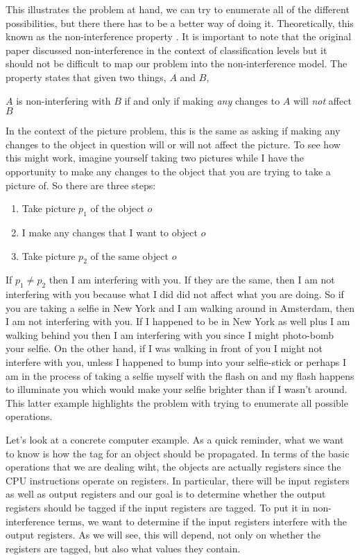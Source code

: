 This illustrates the problem at hand, we can try to enumerate all of the different possibilities, but there 
there has to be a better way of doing it. Theoretically, this known as the non-interference property \cite{Goguen82}. 
It is important to note that the original paper discussed non-interference in the context of classification levels
but it should not be difficult to map our problem into the non-interference model. The property states
that given two things, $A$ and $B$, 

\begin{definition}
$A$ is non-interfering with $B$ if and only if making {\em any} changes to $A$ will {\em not} affect $B$
\end{definition}

In the context of the picture problem, this is the same as asking if
making any changes to the object in question will or will not affect the picture. To see how this 
might work, imagine yourself taking two pictures while I have the opportunity to make any changes 
to the object that you are trying to take a picture of. So there are three steps:

\begin{enumerate}
\item Take picture $p_1$ of the object $o$
\item I make any changes that I want to object $o$
\item Take picture $p_2$ of the same object $o$
\end{enumerate}

If $p_1 \neq p_2$ then I am interfering with you. If they are the same, then I am not interfering
with you because what I did did not affect what you are doing. So if you are taking a selfie in New York
and I am walking around in Amsterdam, then I am not interfering with you. If I happened to be in New York
as well plus I am walking behind you then I am interfering with you since I might photo-bomb your 
selfie. On the other hand, if I was walking in front of you I might not interfere with you, unless
I happened to bump into your selfie-stick or perhaps I am in the process of taking a selfie myself
with the flash on and my flash happens to illuminate you which would make your selfie brighter than
if I wasn't around. This latter example highlights the problem with trying to enumerate all possible
operations. 

Let’s look at a concrete computer example.
As a quick reminder, what we want to know is how the tag for an object should be propagated. In terms of
the basic operations that we are dealing wiht, the objects are actually registers since the CPU 
instructions operate on registers. In particular, there will be input registers as well as output
registers and our goal is to determine whether the output registers should be tagged if the 
input registers are tagged. To put it in non-interference terms, we want to determine if
the input registers interfere with the output registers. As we will see, this will depend, not 
only on whether the registers are tagged, but also what values they contain. 

